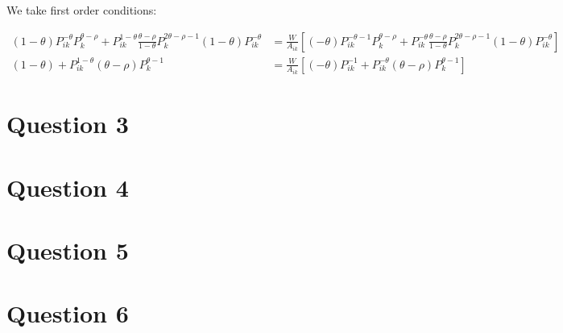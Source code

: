 \documentclass[11pt]{article} %
\begin{document}
We take first order conditions:

\begin{align*}
(1-\theta)P_{ik}^{-\theta}P_k^{\theta - \rho} + P_{ik}^{1-\theta} \frac{\theta - \rho}{1-\theta}P_k^{2\theta - \rho - 1}(1-\theta)P_{ik}^{-\theta} &= \frac{W}{A_{ik}}\left[ (-\theta)P_{ik}^{-\theta-1}P_k^{\theta-\rho} + P_{ik}^{-\theta} \frac{\theta - \rho}{1-\theta} P_k^{2\theta - \rho - 1}(1-\theta)P_{ik}^{-\theta}\right]\\
(1-\theta) + P_{ik}^{1-\theta} (\theta - \rho)P_k^{\theta  - 1} &= \frac{W}{A_{ik}}\left[ (-\theta)P_{ik}^{-1} + P_{ik}^{-\theta} (\theta - \rho) P_k^{\theta - 1}\right]
\end{align*}

\section{Question 3}
\section{Question 4}
\section{Question 5}
\section{Question 6}
\end{document}
